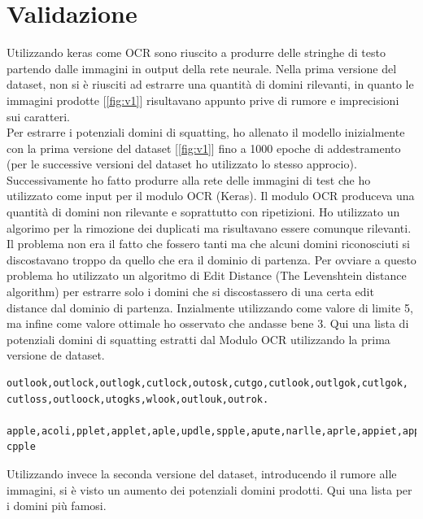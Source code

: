 \section{Validazione}
Utilizzando keras come OCR sono riuscito a produrre delle stringhe di testo partendo dalle immagini in output della rete neurale. Nella prima versione del dataset, non si è riusciti ad estrarre una quantità di domini rilevanti, in quanto le immagini prodotte [\ref{fig:v1}] risultavano appunto prive di rumore e imprecisioni sui caratteri.\\
Per estrarre i potenziali domini di squatting, ho allenato il modello inizialmente con la prima versione del dataset [\ref{fig:v1}] fino a 1000 epoche di addestramento (per le successive versioni del dataset ho utilizzato lo stesso approcio). Successivamente ho fatto produrre alla rete delle immagini di test che ho utilizzato come input per il modulo OCR (Keras). Il modulo OCR produceva una quantità di domini non rilevante e soprattutto con ripetizioni. Ho utilizzato un algorimo per la rimozione dei duplicati ma risultavano essere comunque rilevanti. Il problema non era il fatto che fossero tanti ma che alcuni domini riconosciuti si discostavano troppo da quello che era il dominio di partenza. Per ovviare a questo problema ho utilizzato un algoritmo di Edit Distance (The Levenshtein distance algorithm) per estrarre solo i domini che si discostassero di una certa edit distance dal dominio di partenza. Inzialmente utilizzando come valore di limite 5, ma infine come valore ottimale ho osservato che andasse bene 3.
Qui una lista di potenziali domini di squatting estratti dal Modulo OCR utilizzando la prima versione de dataset.

\begin{verbatim}
outlook,outlock,outlogk,cutlock,outosk,cutgo,cutlook,outlgok,cutlgok,
cutloss,outloock,utogks,wlook,outlouk,outrok.

apple,acoli,pplet,applet,aple,updle,spple,apute,narlle,aprle,appiet,applel,
cpple
\end{verbatim}

Utilizzando invece la seconda versione del dataset, introducendo il rumore alle immagini, si è visto un aumento dei potenziali domini prodotti. Qui una lista per i domini più famosi.

